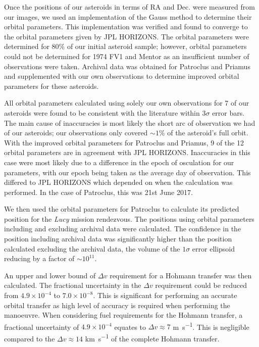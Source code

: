 \documentclass[10pt, twocolumn]{revtex4}    %
\newcommand{\Lucy}{\textit{Lucy }}
\begin{document}
Once the positions of our asteroids in terms of RA and Dec. were measured from our images, we used an implementation of the Gauss method to determine their orbital parameters. This implementation was verified and found to converge to the orbital parameters given by JPL HORIZONS. The orbital parameters were determined for $80\%$ of our initial asteroid sample; however, orbital parameters could not be determined for 1974 FV1 and Mentor as an insufficient number of observations were taken. Archival data was obtained for Patroclus and Priamus and supplemented with our own observations to determine improved orbital parameters for these asteroids.

All orbital parameters calculated using solely our own observations for 7 of our asteroids were found to be consistent with the literature within $3\sigma$ error bars. The main cause of inaccuracies is most likely the short arc of observation we had of our asteroids; our observations only covered ${\sim}1\%$ of the asteroid's full orbit. With the improved orbital parameters for Patroclus and Priamus, 9 of the 12 orbital parameters are in agreement with JPL HORIZONS. Inaccuracies in this case were most likely due to a difference in the epoch of osculation for our parameters, with our epoch being taken as the average day of observation. This differed to JPL HORIZONS which depended on when the calculation was performed. In the case of Patroclus, this was 21st June 2017.

We then used the orbital parameters for Patroclus to calculate its predicted position for the \Lucy mission rendezvous. The positions using orbital parameters including and excluding archival data were calculated. The confidence in the position including archival data was significantly higher than the position calculated excluding the archival data, the volume of the $1\sigma$ error ellipsoid reducing by a factor of ${\sim}10^{11}$.

An upper and lower bound of $\Delta v$ requirement for a Hohmann transfer was then calculated. The fractional uncertainty in the $\Delta v$ requirement could be reduced from $4.9 \times 10^{-4}$ to $7.0 \times 10^{-8}$. This is significant for performing an accurate orbital transfer as high level of accuracy is required when performing the manoeuvre. When considering fuel requirements for the Hohmann transfer, a fractional uncertainty of $4.9 \times 10^{-4}$ equates to $\Delta v \approx 7$ \si{\metre\per\second}. This is negligible compared to the $\Delta v \approx 14$ \si{\kilo\metre\per\second} of the complete Hohmann transfer.
 
\end{document}
